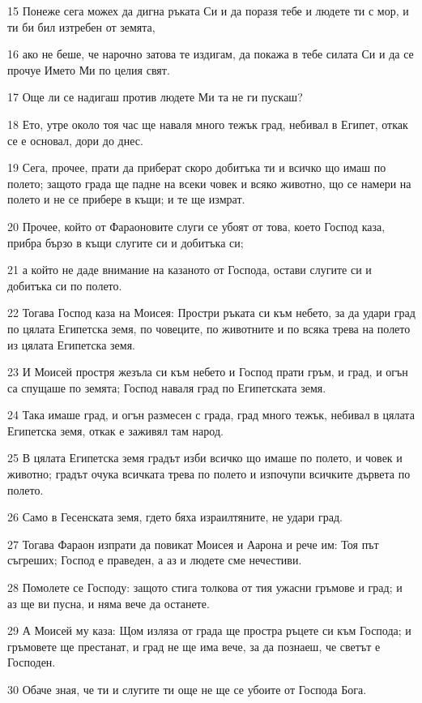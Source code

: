 \par 15 Понеже сега можех да дигна ръката Си и да поразя тебе и людете ти с мор, и ти би бил изтребен от земята,
\par 16 ако не беше, че нарочно затова те издигам, да покажа в тебе силата Си и да се прочуе Името Ми по целия свят.
\par 17 Още ли се надигаш против людете Ми та не ги пускаш?
\par 18 Ето, утре около тоя час ще наваля много тежък град, небивал в Египет, откак се е основал, дори до днес.
\par 19 Сега, прочее, прати да приберат скоро добитъка ти и всичко що имаш по полето; защото града ще падне на всеки човек и всяко животно, що се намери на полето и не се прибере в къщи; и те ще измрат.
\par 20 Прочее, който от Фараоновите слуги се убоят от това, което Господ каза, прибра бързо в къщи слугите си и добитъка си;
\par 21 а който не даде внимание на казаното от Господа, остави слугите си и добитъка си по полето.
\par 22 Тогава Господ каза на Моисея: Простри ръката си към небето, за да удари град по цялата Египетска земя, по човеците, по животните и по всяка трева на полето из цялата Египетска земя.
\par 23 И Моисей простря жезъла си към небето и Господ прати гръм, и град, и огън са спущаше по земята; Господ наваля град по Египетската земя.
\par 24 Така имаше град, и огън размесен с града, град много тежък, небивал в цялата Египетска земя, откак е заживял там народ.
\par 25 В цялата Египетска земя градът изби всичко що имаше по полето, и човек и животно; градът очука всичката трева по полето и изпочупи всичките дървета по полето.
\par 26 Само в Гесенската земя, гдето бяха израилтяните, не удари град.
\par 27 Тогава Фараон изпрати да повикат Моисея и Аарона и рече им: Тоя път съгреших; Господ е праведен, а аз и людете сме нечестиви.
\par 28 Помолете се Господу: защото стига толкова от тия ужасни гръмове и град; и аз ще ви пусна, и няма вече да останете.
\par 29 А Моисей му каза: Щом изляза от града ще простра ръцете си към Господа; и гръмовете ще престанат, и град не ще има вече, за да познаеш, че светът е Господен.
\par 30 Обаче зная, че ти и слугите ти още не ще се убоите от Господа Бога.
